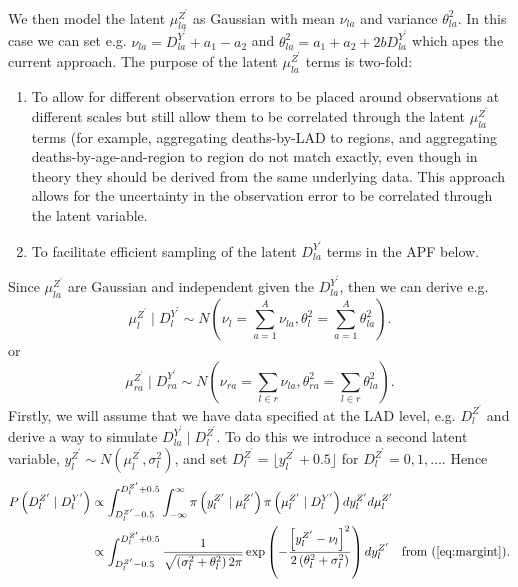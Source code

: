 \documentclass[a4paper]{article}
\begin{document}
We then model the latent $\mu^{Z^\prime}_{la}$ as Gaussian with mean $\nu_{la}$ and variance $\theta^2_{la}$. In this case we can set e.g. $\nu_{la} = D^{Y^\prime}_{la} + a_1 - a_2$ and $\theta^2_{la} = a_1 + a_2 + 2bD^{Y^\prime}_{la}$ which apes the current approach. The purpose of the latent $\mu^{Z^\prime}_{la}$ terms is two-fold:
\begin{enumerate}
    \item To allow for different observation errors to be placed around observations at different scales but still allow them to be correlated through the latent $\mu^{Z^\prime}_{la}$ terms (for example, aggregating deaths-by-LAD to regions, and aggregating deaths-by-age-and-region to region do not match exactly, even though in theory they should be derived from the same underlying data. This approach allows for the uncertainty in the observation error to be correlated through the latent variable.
    \item To facilitate efficient sampling of the latent $D^{Y^\prime}_{la}$ terms in the APF below.
\end{enumerate}
Since $\mu^{Z^\prime}_{la}$ are Gaussian and independent given the $D^{Y^\prime}_{la}$, then we can derive e.g.
\begin{equation*}
    \mu^{Z^\prime}_l \mid D^{Y^\prime}_l \sim N\left(\nu_l = \sum_{a = 1}^A \nu_{la}, \theta^2_l = \sum_{a = 1}^A \theta^2_{la}\right).
\end{equation*}
or
\begin{equation*}
    \mu^{Z^\prime}_{ra} \mid D^{Y^\prime}_{ra} \sim N\left(\nu_{ra} = \sum_{l \in r} \nu_{la}, \theta^2_{ra} = \sum_{l \in r} \theta^2_{la}\right).
\end{equation*}
Firstly, we will assume that we have data specified at the LAD level, e.g. $D^{Z^\prime}_l$ and derive a way to simulate $D^{Y^\prime}_{la} \mid D^{Z^\prime}_l$. To do this we introduce a second latent variable, $y^{Z^\prime}_l \sim N\left(\mu^{Z^\prime}_l, \sigma^2_l\right)$, and set $D^{Z^\prime}_l = \lfloor y^{Z^\prime}_l + 0.5 \rfloor$ for $D^{Z^\prime}_l = 0, 1, \dots$. Hence
\begin{align}
    P\left(D^{Z^\prime}_l \mid D^{Y^\prime}_l\right) &\propto \int_{D^{Z^\prime}_l - 0.5}^{D^{Z^\prime}_l + 0.5} \int_{-\infty}^\infty \pi\left(y^{Z^\prime}_l \mid \mu^{Z^\prime}_l\right)\pi\left(\mu^{Z^\prime}_l \mid D^{Y^\prime}_l\right) dy^{Z^\prime}_l d \mu^{Z^\prime}_l\nonumber\\
    &\propto \int_{D^{Z^\prime}_l - 0.5}^{D^{Z^\prime}_l + 0.5} \frac{1}{\sqrt{\left(\sigma^2_l + \theta^2_l\right)2\pi}} \exp\left(-\frac{\left[y^{Z^\prime}_l - \nu_l\right]^2}{2\left(\theta^2_l + \sigma^2_l\right)}\right)dy^{Z^\prime}_l \quad \mbox{from (\ref{eq:margint})}.\label{eq:int}
\end{align}
\end{document}

